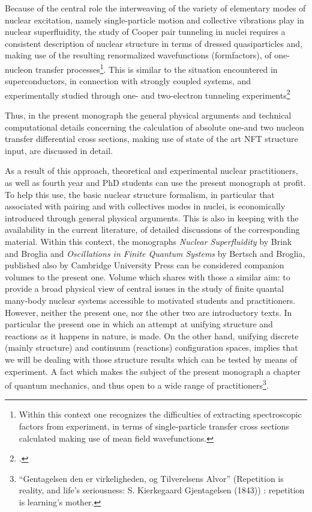 Because of the central role the interweaving of the variety of elementary modes of nuclear excitation, namely single-particle motion and collective vibrations play in nuclear superfluidity, the study of Cooper pair tunneling in nuclei requires  a consistent description of nuclear structure in terms of dressed quasiparticles and, making use of the resulting renormalized wavefunctions (formfactors),  of one-nucleon transfer processes\footnote{Within this context one recognizes the difficulties of extracting spectroscopic factors from experiment, in terms of single-particle transfer cross sections calculated making use of mean field wavefunctions.}. This is similar to the situation encountered in superconductors, in connection with strongly coupled systems, and experimentally studied through one- and two-electron tunneling experiments\footnote{\cite{Giaver:73}.} 

Thus, in the present monograph the general physical arguments and technical computational details concerning the   calculation of  absolute one-and two nucleon  transfer differential cross sections, making use of state of the art NFT structure input, are discussed in detail. 


As a result of this approach, theoretical and experimental nuclear practitioners, as well as fourth year and PhD students can use the present monograph at profit. To help this use, the basic nuclear structure formalism, in particular that associated with pairing and with collectives modes in nuclei, is economically introduced through general physical arguments. This is also in keeping with the availability in the current literature, of detailed discussions of the corresponding material. Within this context, the monographs \emph{Nuclear Superfluidity} by Brink and Broglia and \emph{Oscillations in Finite Quantum Systems}  by Bertsch and Broglia, published also by Cambridge University Press can be considered companion volumes to the present one. Volume which shares with those a similar aim: to provide a broad physical view of central issues in the study of finite quantal many-body nuclear systems accessible to motivated students and practitioners. However, neither the present one, nor the other two are introductory texts. In particular the present one in which an attempt at unifying structure and reactions as it happens in nature, is made. On the other hand, unifying discrete (mainly structure) and continuum (reactions) configuration spaces, implies that we will be dealing with those structure results which can be tested by means of experiment. A fact which makes the subject of the present monograph a chapter of quantum mechanics, and thus open to a wide range of practitioners\footnote{``Gentagelsen den er virkeligheden, og Tilverelsens Alvor'' (Repetition is reality, and life's seriousness: S. Kierkegaard Gjentagelsen (1843)) {} : repetition is learning's mother.}.

